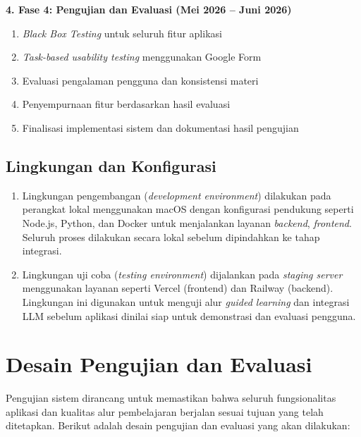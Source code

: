\textbf{4. Fase 4: Pengujian dan Evaluasi (Mei 2026 – Juni 2026)}
\begin{enumerate}[label=\alph*.]
    \item \textit{Black Box Testing} untuk seluruh fitur aplikasi
    \item \textit{Task-based usability testing} menggunakan Google Form
    \item Evaluasi pengalaman pengguna dan konsistensi materi
    \item Penyempurnaan fitur berdasarkan hasil evaluasi
    \item Finalisasi implementasi sistem dan dokumentasi hasil pengujian
\end{enumerate}

\subsection{Lingkungan dan Konfigurasi}

\begin{enumerate}
    \item Lingkungan pengembangan (\textit{development environment}) dilakukan 
    pada perangkat lokal menggunakan macOS dengan konfigurasi pendukung seperti 
    Node.js, Python, dan Docker untuk menjalankan layanan \textit{backend}, 
    \textit{frontend}. Seluruh proses dilakukan secara lokal 
    sebelum dipindahkan ke tahap integrasi.

    \item Lingkungan uji coba (\textit{testing environment}) dijalankan pada 
    \textit{staging server} menggunakan layanan seperti Vercel (frontend) dan 
    Railway (backend). Lingkungan ini digunakan untuk menguji alur 
    \textit{guided learning} dan integrasi LLM sebelum 
    aplikasi dinilai siap untuk demonstrasi dan evaluasi pengguna.
\end{enumerate}

\section{Desain Pengujian dan Evaluasi}

Pengujian sistem dirancang untuk memastikan bahwa seluruh fungsionalitas aplikasi
dan kualitas alur pembelajaran berjalan sesuai tujuan yang telah ditetapkan.
Berikut adalah desain pengujian dan evaluasi yang akan dilakukan:

